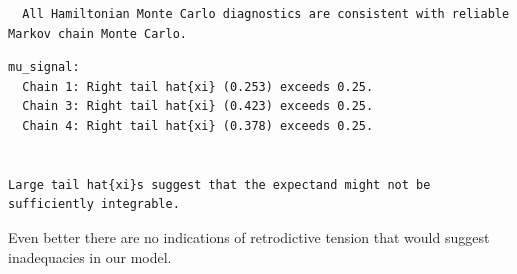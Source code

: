 \documentclass[
  letterpaper,
  DIV=11,
  numbers=noendperiod]{scrartcl}
\newenvironment{Shaded}{\begin{snugshade}}{\end{snugshade}}
\newcommand{\AttributeTok}[1]{\textcolor[rgb]{0.40,0.45,0.13}{#1}}
\newcommand{\DecValTok}[1]{\textcolor[rgb]{0.68,0.00,0.00}{#1}}
\newcommand{\FunctionTok}[1]{\textcolor[rgb]{0.28,0.35,0.67}{#1}}
\newcommand{\NormalTok}[1]{\textcolor[rgb]{0.00,0.23,0.31}{#1}}
\newcommand{\OtherTok}[1]{\textcolor[rgb]{0.00,0.23,0.31}{#1}}
\newcommand{\SpecialCharTok}[1]{\textcolor[rgb]{0.37,0.37,0.37}{#1}}
\newcommand{\StringTok}[1]{\textcolor[rgb]{0.13,0.47,0.30}{#1}}
\begin{document}
\begin{verbatim}
  All Hamiltonian Monte Carlo diagnostics are consistent with reliable
Markov chain Monte Carlo.
\end{verbatim}

\begin{Shaded}
\end{Shaded}

\begin{verbatim}
mu_signal:
  Chain 1: Right tail hat{xi} (0.253) exceeds 0.25.
  Chain 3: Right tail hat{xi} (0.423) exceeds 0.25.
  Chain 4: Right tail hat{xi} (0.378) exceeds 0.25.


Large tail hat{xi}s suggest that the expectand might not be
sufficiently integrable.
\end{verbatim}

Even better there are no indications of retrodictive tension that would
suggest inadequacies in our model.

\begin{Shaded}
\end{Shaded}
\end{document}
